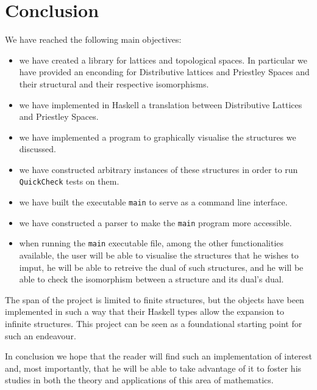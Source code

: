 
\section{Conclusion}\label{sec:Conclusion}

We have reached the following main objectives:

\begin{itemize}


    \item we have created a library for lattices and topological spaces. In particular we have provided an enconding for Distributive lattices and Priestley Spaces and their structural and their respective isomorphisms.  
    \item we have implemented in Haskell a translation between Distributive Lattices and Priestley Spaces. 
    \item we have implemented a program to graphically visualise the structures we discussed.  
    \item we have constructed arbitrary instances of these structures in order to run \texttt{QuickCheck} tests on them.
    \item we have built the executable \texttt{main} to serve as a command line interface.  
    \item we have constructed a parser to make the \texttt{main} program more accessible.   
    \item when running the \texttt{main} executable file, among the other functionalities available, the user will be able to visualise the structures that he wishes to imput, he will be able to retreive the dual of such structures, and he will be able to check the isomorphism between a structure and its dual's dual. 
\end{itemize}

The span of the project is limited to finite structures, but the objects have been implemented in such a way that their Haskell types allow the expansion to infinite structures. This project can be seen as a foundational starting point for such an endeavour. 

In conclusion we hope that the reader will find such an implementation of interest and, most importantly, that he will be able to take advantage of it to foster his studies in both the theory and applications of this area of mathematics. 